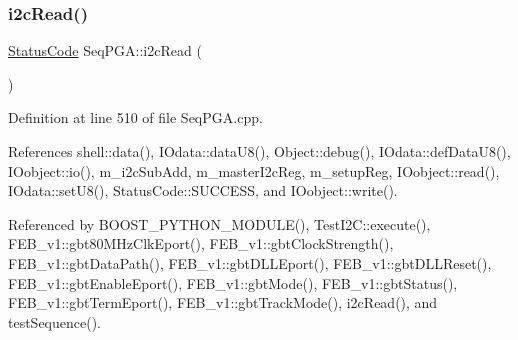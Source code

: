 \subsubsection{\texorpdfstring{i2c\+Read()}{i2cRead()}\hspace{0.1cm}{\footnotesize\ttfamily [1/2]}}
{\footnotesize\ttfamily \hyperlink{classStatusCode}{Status\+Code} Seq\+P\+G\+A\+::i2c\+Read (\begin{DoxyParamCaption}{ }\end{DoxyParamCaption})}



Definition at line 510 of file Seq\+P\+G\+A.\+cpp.



References shell\+::data(), I\+Odata\+::data\+U8(), Object\+::debug(), I\+Odata\+::def\+Data\+U8(), I\+Oobject\+::io(), m\+\_\+i2c\+Sub\+Add, m\+\_\+master\+I2c\+Reg, m\+\_\+setup\+Reg, I\+Oobject\+::read(), I\+Odata\+::set\+U8(), Status\+Code\+::\+S\+U\+C\+C\+E\+SS, and I\+Oobject\+::write().



Referenced by B\+O\+O\+S\+T\+\_\+\+P\+Y\+T\+H\+O\+N\+\_\+\+M\+O\+D\+U\+L\+E(), Test\+I2\+C\+::execute(), F\+E\+B\+\_\+v1\+::gbt80\+M\+Hz\+Clk\+Eport(), F\+E\+B\+\_\+v1\+::gbt\+Clock\+Strength(), F\+E\+B\+\_\+v1\+::gbt\+Data\+Path(), F\+E\+B\+\_\+v1\+::gbt\+D\+L\+L\+Eport(), F\+E\+B\+\_\+v1\+::gbt\+D\+L\+L\+Reset(), F\+E\+B\+\_\+v1\+::gbt\+Enable\+Eport(), F\+E\+B\+\_\+v1\+::gbt\+Mode(), F\+E\+B\+\_\+v1\+::gbt\+Status(), F\+E\+B\+\_\+v1\+::gbt\+Term\+Eport(), F\+E\+B\+\_\+v1\+::gbt\+Track\+Mode(), i2c\+Read(), and test\+Sequence().


